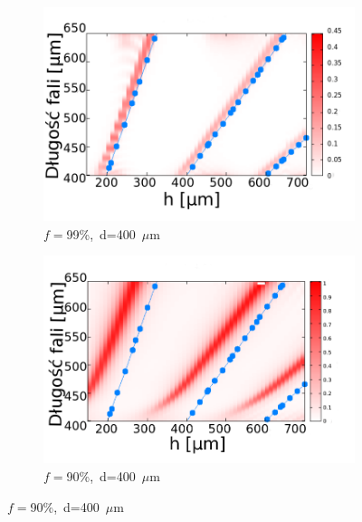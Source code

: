 \begin{figure}[tb]
\begin{subfigure}{0.45\textwidth}
	\includegraphics[width=\textwidth]{images/antenaThz/rezonant_trans_f001.png}
	\caption{$f=$99\%,~d=400~$\mu$m }
	\label{fig:rezof001}
\end{subfigure}
\begin{subfigure}{0.45\textwidth}
	\includegraphics[width=\textwidth]{images/antenaThz/rezonant_trans_f01.png}
	\caption{$f=$90\%,~d=400~$\mu$m }
	\label{fig:rezof01}
\end{subfigure}


\end{figure}
